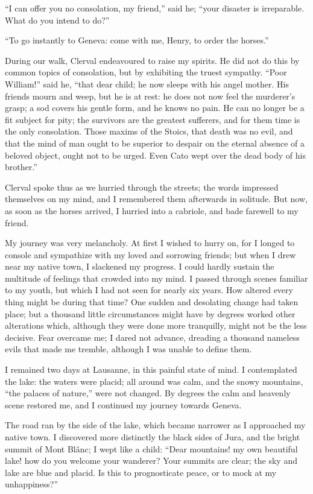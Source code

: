 ``I can offer you no consolation, my
friend,'' said he; ``your disaster is irreparable.
What do you intend to
do?''

``To go instantly to Geneva: come
with me, Henry, to order the horses.''

During our walk, Clerval endeavoured
to raise my spirits. He did not
do this by common topics of consolation,
but by exhibiting the truest sympathy.
``Poor William!'' said he, ``that
dear child; he now sleeps with his angel
mother. His friends mourn and
weep, but he is at rest: he does not
now feel the murderer's grasp; a sod
covers his gentle form, and he knows
no pain. He can no longer be a fit
subject for pity; the survivors are the
greatest sufferers, and for them time is
the only consolation. Those maxims
of the Stoics, that death was no evil,
and that the mind of man ought to be
superior to despair on the eternal
absence of a beloved object, ought not to
be urged. Even Cato wept over the
dead body of his brother.''

Clerval spoke thus as we hurried
through the streets; the words impressed
themselves on my mind, and I
remembered them afterwards in solitude.
But now, as soon as the horses
arrived, I hurried into a cabriole, and
bade farewell to my friend.

My journey was very melancholy.
At first I wished to hurry on, for I
longed to console and sympathize with
my loved and sorrowing friends; but
when I drew near my native town, I
slackened my progress. I could hardly
sustain the multitude of feelings that
crowded into my mind. I passed
through scenes familiar to my youth,
but which I had not seen for nearly six
years. How altered every thing might
be during that time? One sudden and
desolating change had taken place; but
a thousand little circumstances might
have by degrees worked other alterations
which, although they were done
more tranquilly, might not be the less
decisive. Fear overcame me; I dared
not advance, dreading a thousand
nameless evils that made me tremble, although
I was unable to define them.

I remained two days at Lausanne, in
this painful state of mind. I contemplated
the lake: the waters were placid;
all around was calm, and the snowy
mountains, ``the palaces of nature,''
were not changed. By degrees the
calm and heavenly scene restored me,
and I continued my journey towards
Geneva.

The road ran by the side of the lake,
which became narrower as I approached
my native town. I discovered more
distinctly the black sides of Jura, and
the bright summit of Mont Blânc; I
wept like a child: ``Dear mountains!
my own beautiful lake! how do you
welcome your wanderer? Your summits
are clear; the sky and lake are
blue and placid. Is this to prognosticate
peace, or to mock at my unhappiness?''

